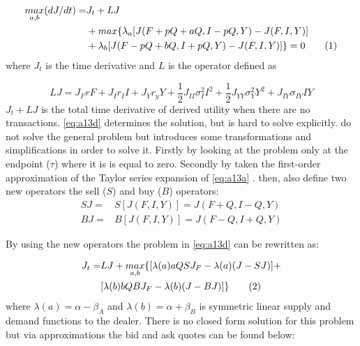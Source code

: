 \documentclass{kththesis}
\theoremstyle{definition}
\newcommand\numberthis{\addtocounter{equation}{1}\tag{\theequation}}
\begin{document}
\begin{align*}
    \label{eq:a13d}
    \underset{a,b}{max}(dJ/dt) = & J_t + LJ \\
    & + max\{\lambda_a[J(F+pQ+aQ, I-pQ,Y) - J(F,I,Y)] \\
    & + \lambda_b [J(F-pQ+bQ, I+pQ,Y) - J(F,I,Y)] \} = 0 \numberthis
\end{align*}
where $J_t$ is the time derivative and $L$ is the operator defined as

\begin{equation}
    LJ = J_{F}rF + J_{I}r_{I}I+J_{Y}r_{y}Y+\frac{1}{2}J_{II}\sigma^{2}_{I}I^{2}+ \frac{1}{2}J_{YY}\sigma^{2}_{Y}Y^{2} + J_{IY}\sigma_{IY}IY
\end{equation}
$J_t + LJ$ is the total time derivative of derived utility when there are no transactions. \autoref{eq:a13d} determines the solution, but is hard to solve explicitly. \textcite{ho1981optimal} do not solve the general problem but introduces some transformations and simplifications in order to solve it. Firstly by looking at the problem only at the endpoint ($\tau$) where it is is equal to zero. Secondly by taken the first-order approximation of the Taylor series expansion of \autoref{eq:a13a} \parencite{o1995market}. \textcite{ho1981optimal} then, also define two new operators the sell ($S$) and buy ($B$) operators:
\begin{align}
    \label{eq:a13e}
    SJ = & S[J(F,I,Y)] = J(F+Q,I-Q, Y) \\
    BJ = & B[J(F,I,Y)] = J(F-Q, I+Q, Y)
\end{align}

By using the new operators the problem in \autoref{eq:a13d} can be rewritten as:

\begin{align*}
    \label{eq:a13e2}
    J_{t} = & LJ + \underset{a,b}{max}\{[\lambda(a)aQSJ_{F} - \lambda(a)(J-SJ)] + \\
    & [\lambda(b)bQBJ_{F} - \lambda(b)(J-BJ)]\} 
    \numberthis
\end{align*}
where $\lambda(a) = \alpha - \beta_{A}$ and $\lambda(b) = \alpha + \beta_{B} $ is symmetric linear supply and demand functions to the dealer. There is no closed form solution for this problem but via approximations the bid and ask quotes can be found below:
\end{document}
